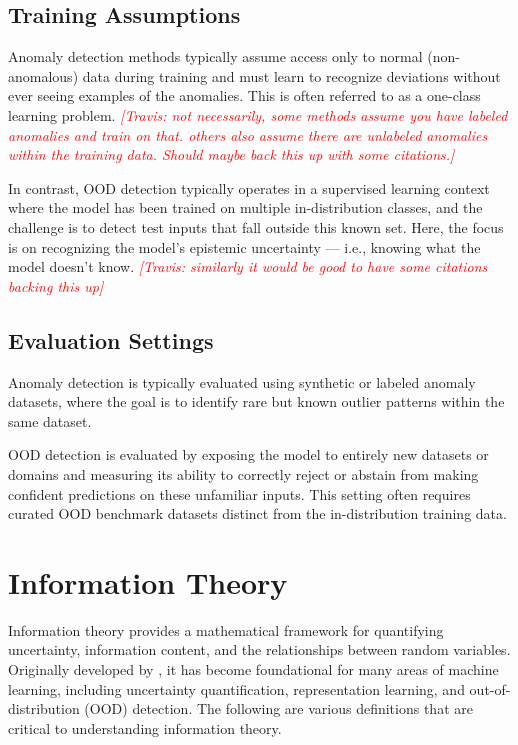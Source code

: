\documentclass[11pt, oneside]{book}
\theoremstyle{plain}
\theoremstyle{definition}
\theoremstyle{remark}
\newcommand{\travis}[1]{\textcolor{red}{{\it [Travis: #1]}}}
\begin{document}
\subsection{Training Assumptions}

Anomaly detection methods typically assume access only to normal (non-anomalous) data during training and must learn to recognize deviations without ever seeing examples of the anomalies. This is often referred to as a one-class learning problem. \travis{not necessarily, some methods assume you have labeled anomalies and train on that.  others also assume there are unlabeled anomalies within the training data. Should maybe back this up with some citations.}

In contrast, OOD detection typically operates in a supervised learning context where the model has been trained on multiple in-distribution classes, and the challenge is to detect test inputs that fall outside this known set. Here, the focus is on recognizing the model’s epistemic uncertainty — i.e., knowing what the model doesn’t know. \travis{similarly it would be good to have some citations backing this up}

\subsection{Evaluation Settings}

Anomaly detection is typically evaluated using synthetic or labeled anomaly datasets, where the goal is to identify rare but known outlier patterns within the same dataset.

OOD detection is evaluated by exposing the model to entirely new datasets or domains and measuring its ability to correctly reject or abstain from making confident predictions on these unfamiliar inputs. This setting often requires curated OOD benchmark datasets distinct from the in-distribution training data.

\section{Information Theory}

Information theory provides a mathematical framework for quantifying uncertainty, information content, and the relationships between random variables. Originally developed by \citet{shannon1948mathematical}, it has become foundational for many areas of machine learning, including uncertainty quantification, representation learning, and out-of-distribution (OOD) detection. The following are various definitions that are critical to understanding information theory.
\end{document}
